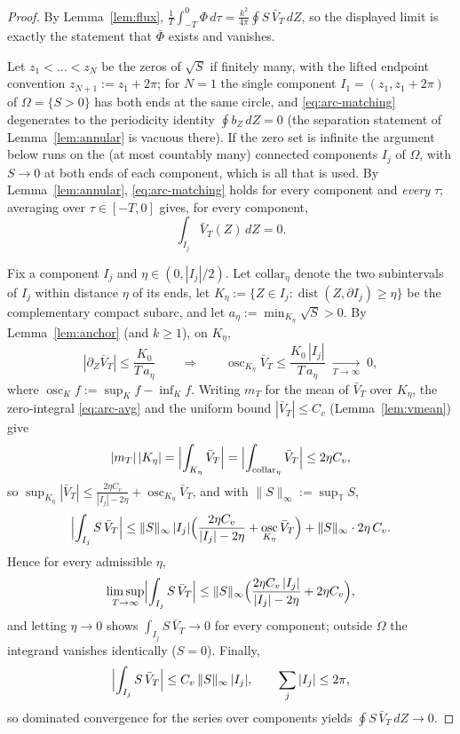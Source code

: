 \documentclass[11pt]{amsart}
\theoremstyle{definition}
\theoremstyle{remark}
\newcommand{\T}{\mathbb{T}}
\newcommand{\Fbar}{\bar\Phi}
\DeclareMathOperator{\osc}{osc}
\begin{document}
\begin{proof}
By Lemma~\ref{lem:flux},
$\frac1T\int_{-T}^0\Phi\,d\tau=\frac{k^2}{4\pi}\oint S\,\bar V_T\,dZ$,
so the displayed limit is exactly the statement that $\Fbar$ exists and
vanishes.

Let $z_1<\dots<z_N$ be the zeros of $\sqrt S$ if finitely many, with
the lifted endpoint convention $z_{N+1}:=z_1+2\pi$; for $N=1$ the
single component $I_1=(z_1,z_1+2\pi)$ of $\Omega=\{S>0\}$ has both ends
at the same circle, and \eqref{eq:arc-matching} degenerates to the
periodicity identity $\oint b_Z\,dZ=0$ (the separation statement of
Lemma~\ref{lem:annular} is vacuous there). If the zero set is infinite
the argument below runs on the (at most countably many) connected
components $I_j$ of $\Omega$, with $S\to0$ at both ends of each
component, which is all that is used. By Lemma~\ref{lem:annular},
\eqref{eq:arc-matching} holds for every component and \emph{every}
$\tau$; averaging over $\tau\in[-T,0]$ gives, for every component,
\begin{equation}\label{eq:arc-avg}
  \int_{I_j}\bar V_T(Z)\,dZ=0 .
\end{equation}

Fix a component $I_j$ and $\eta\in(0,|I_j|/2)$. Let
$\text{collar}_\eta$ denote the two subintervals of $I_j$ within
distance $\eta$ of its ends, let
$K_\eta:=\{Z \in I_j : \operatorname{dist}(Z,\partial I_j)\ge\eta\}$ be
the complementary compact subarc, and let
$a_\eta:=\min_{K_\eta}\sqrt S>0$. By Lemma~\ref{lem:anchor} (and
$k\ge1$), on $K_\eta$,
\[
  |\partial_Z\bar V_T|\le\frac{K_0}{T\,a_\eta}
  \qquad\Longrightarrow\qquad
  \osc_{K_\eta}\bar V_T\le\frac{K_0\,|I_j|}{T\,a_\eta}
  \;\xrightarrow[T\to\infty]{}\;0 ,
\]
where $\osc_{K}f:=\sup_{K}f-\inf_{K}f$. Writing $m_T$ for the mean of
$\bar V_T$ over $K_\eta$, the zero-integral \eqref{eq:arc-avg} and the
uniform bound $|\bar V_T|\le C_v$ (Lemma~\ref{lem:vmean}) give
\[
  |m_T|\,|K_\eta|=\Bigl|\int_{K_\eta}\bar V_T\Bigr|
  =\Bigl|\int_{\text{collar}_\eta}\bar V_T\Bigr|\le 2\eta C_v ,
\]
so $\sup_{K_\eta}|\bar V_T|\le \frac{2\eta C_v}{|I_j|-2\eta}
+\osc_{K_\eta}\bar V_T$, and with $\|S\|_\infty:=\sup_\T S$,
\[
  \Bigl|\int_{I_j}S\,\bar V_T\Bigr|
  \le\|S\|_\infty\,|I_j|\Bigl(\frac{2\eta C_v}{|I_j|-2\eta}
  +\osc_{K_\eta}\bar V_T\Bigr)
  +\|S\|_\infty\cdot2\eta\,C_v .
\]
Hence for every admissible $\eta$,
\[
  \limsup_{T\to\infty}\Bigl|\int_{I_j}S\,\bar V_T\Bigr|
  \le\|S\|_\infty\Bigl(\frac{2\eta C_v\,|I_j|}{|I_j|-2\eta}
  +2\eta C_v\Bigr),
\]
and letting $\eta\to0$ shows $\int_{I_j}S\,\bar V_T\to0$ for every
component; outside $\Omega$ the integrand vanishes identically ($S=0$).
Finally,
\[
  \Bigl|\int_{I_j}S\,\bar V_T\Bigr|\le C_v\,\|S\|_\infty\,|I_j|,
  \qquad \sum_j|I_j|\le2\pi ,
\]
so dominated convergence for the series over components yields
$\oint S\,\bar V_T\,dZ\to0$.
\end{proof}
\end{document}
